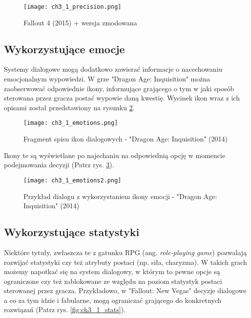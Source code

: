 \begin{figure}[h]
    \texttt{[image: ch3\_1\_precision.png]}
    \caption{Fallout 4 (2015) + wersja zmodowana\cite{spoken_conversational_ai}}
    \centering
    \label{fig:ch3_1_precision}
\end{figure}

\newpage

\subsection{Wykorzystujące emocje}

Systemy dialogowe mogą dodatkowo zawierać informacje o nacechowaniu emocjonalnym wypowiedzi.
W grze "Dragon Age: Inquisition" można zaobserwować odpowiednie ikony, informujące grającego o
tym w jaki sposób sterowana przez gracza postać wypowie daną kwestię. Wycinek ikon wraz z ich
opisami został przedstawiony na rysunku \ref{fig:ch3_1_emotions_list}.

\begin{figure}[h]
    \centering
    \texttt{[image: ch3\_1\_emotions.png]}
    \caption{Fragment spisu ikon dialogowych - "Dragon Age: Inquisition" (2014)\cite{dragon_age_fandom}}
    \label{fig:ch3_1_emotions_list}
\end{figure}

Ikony te są wyświetlane po najechaniu na odpowiednią opcję w momencie podejmowania decyzji
(Patrz rys. \ref{fig:ch3_1_emotions_example}).

\begin{figure}[h]
    \texttt{[image: ch3\_1\_emotions2.png]}
    \caption{Przykład dialogu z wykorzystaniem ikony emocji - "Dragon Age: Inquisition" (2014)}
    \centering
    \label{fig:ch3_1_emotions_example}
\end{figure}

\subsection{Wykorzystujące statystyki}

Niektóre tytuły, zwłaszcza te z gatunku RPG (ang. \textit{role-playing game}) pozwalają rozwijać
statystyki czy też atrybuty postaci (np. siła, charyzma). W takich grach możemy napotkać się na
system dialogowy, w którym to pewne opcje są ograniczone czy też zablokowane ze względu na poziom
statystyk postaci sterowanej przez gracza. Przykładowo, w "Fallout: New Vegas" decyzje dialogowe
a co za tym idzie i fabularne, mogą ograniczać grającego do konkretnych rozwiązań
(Patrz rys. \ref{fig:ch3_1_stats}).

